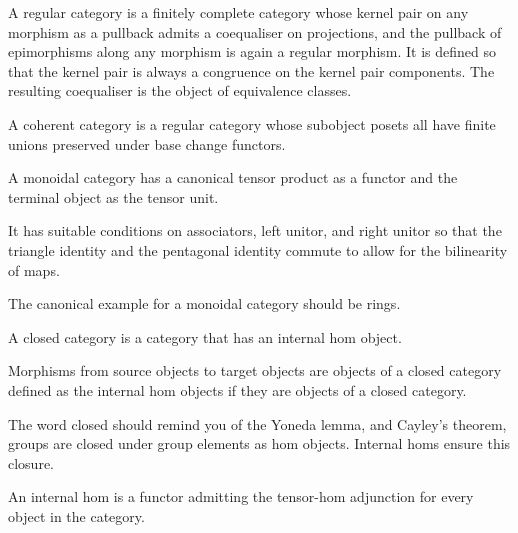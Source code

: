 \begin{definition}
    \label{definition-regular-category}
    A regular category is a finitely complete category whose kernel pair on any morphism as a pullback admits a coequaliser on projections, and the pullback of epimorphisms along any morphism is again a regular morphism. It is defined so that the kernel pair is always a congruence on the kernel pair components. The resulting coequaliser is the object of equivalence classes.
\end{definition}

\begin{definition}
    \label{definition-coherent-category}
    A coherent category is a regular category whose subobject posets all have finite unions preserved under base change functors.
\end{definition}

\begin{definition}
    \label{definition-monoidal-category}
    A monoidal category has a canonical tensor product as a functor and the terminal object as the tensor unit. 
    
    It has suitable conditions on associators, left unitor, and right unitor so that the triangle identity and the pentagonal identity commute to allow for the bilinearity of maps.
\end{definition}

The canonical example for a monoidal category should be rings.

\begin{definition}
    \label{definition-closed-category}
    A closed category is a category that has an internal hom object. 
    
    Morphisms from source objects to target objects are objects of a closed category defined as the internal hom objects if they are objects of a closed category.
\end{definition}

The word closed should remind you of the Yoneda lemma, and Cayley's theorem, groups are closed under group elements as hom objects. Internal homs ensure this closure.

\begin{definition}
    \label{definition-internal-hom-functor}
    An internal hom is a functor admitting the tensor-hom adjunction for every object in the category. 
\end{definition}

